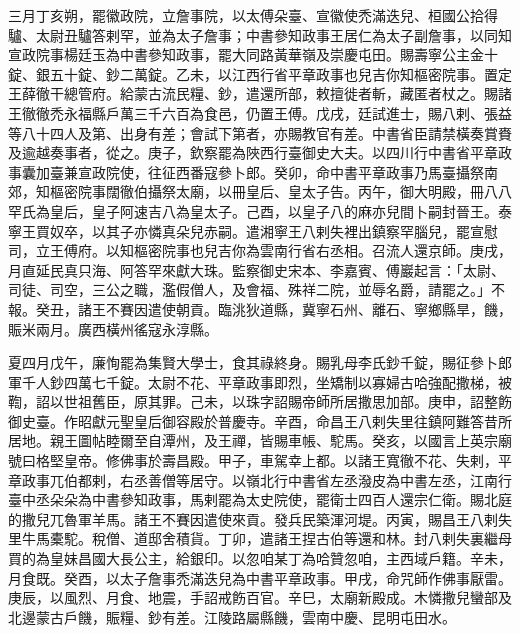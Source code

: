 \begin{pinyinscope}
 三月丁亥朔，罷徽政院，立詹事院，以太傅朵臺、宣徽使禿滿迭兒、桓國公拾得驢、太尉丑驢答剌罕，並為太子詹事；中書參知政事王居仁為太子副詹事，以同知宣政院事楊廷玉為中書參知政事，罷大同路黃華嶺及崇慶屯田。賜壽寧公主金十錠、銀五十錠、鈔二萬錠。乙未，以江西行省平章政事也兒吉你知樞密院事。置定王薛徹干總管府。給蒙古流民糧、鈔，遣還所部，敕擅徙者斬，藏匿者杖之。賜諸王徹徹禿永福縣戶萬三千六百為食邑，仍置王傅。戊戌，廷試進士，賜八剌、張益等八十四人及第、出身有差；會試下第者，亦賜教官有差。中書省臣請禁橫奏賞賚及逾越奏事者，從之。庚子，欽察罷為陜西行臺御史大夫。以四川行中書省平章政事囊加臺兼宣政院使，往征西番寇參卜郎。癸卯，命中書平章政事乃馬臺攝祭南郊，知樞密院事闊徹伯攝祭太廟，以冊皇后、皇太子告。丙午，御大明殿，冊八八罕氏為皇后，皇子阿速吉八為皇太子。己酉，以皇子八的麻亦兒間卜嗣封晉王。泰寧王買奴卒，以其子亦憐真朵兒赤嗣。遣湘寧王八剌失裡出鎮察罕腦兒，罷宣慰司，立王傅府。以知樞密院事也兒吉你為雲南行省右丞相。召流人還京師。庚戌，月直延民真只海、阿答罕來獻大珠。監察御史宋本、李嘉賓、傅巖起言：「太尉、司徒、司空，三公之職，濫假僧人，及會福、殊祥二院，並辱名爵，請罷之。」不報。癸丑，諸王不賽因遣使朝貢。臨洮狄道縣，冀寧石州、離石、寧鄉縣旱，饑，賑米兩月。廣西橫州徭寇永淳縣。



 夏四月戊午，廉恂罷為集賢大學士，食其祿終身。賜乳母李氏鈔千錠，賜征參卜郎軍千人鈔四萬七千錠。太尉不花、平章政事即烈，坐矯制以寡婦古哈強配撒梯，被鞫，詔以世祖舊臣，原其罪。己未，以珠字詔賜帝師所居撒思加部。庚申，詔整飭御史臺。作昭獻元聖皇后御容殿於普慶寺。辛酉，命昌王八剌失里往鎮阿難答昔所居地。親王圖帖睦爾至自潭州，及王禪，皆賜車帳、駝馬。癸亥，以國言上英宗廟號曰格堅皇帝。修佛事於壽昌殿。甲子，車駕幸上都。以諸王寬徹不花、失剌，平章政事兀伯都剌，右丞善僧等居守。以嶺北行中書省左丞潑皮為中書左丞，江南行臺中丞朵朵為中書參知政事，馬剌罷為太史院使，罷衛士四百人還宗仁衛。賜北庭的撒兒兀魯軍羊馬。諸王不賽因遣使來貢。發兵民築渾河堤。丙寅，賜昌王八剌失里牛馬橐駝。稅僧、道邸舍積貨。丁卯，遣諸王捏古伯等還和林。封八剌失裏繼母買的為皇妹昌國大長公主，給銀印。以忽咱某丁為哈贊忽咱，主西域戶籍。辛未，月食既。癸酉，以太子詹事禿滿迭兒為中書平章政事。甲戌，命咒師作佛事厭雷。庚辰，以風烈、月食、地震，手詔戒飭百官。辛巳，太廟新殿成。木憐撒兒蠻部及北邊蒙古戶饑，賑糧、鈔有差。江陵路屬縣饑，雲南中慶、昆明屯田水。




\end{pinyinscope}
